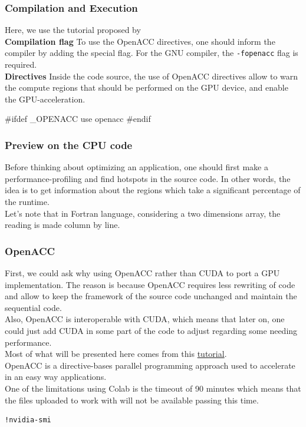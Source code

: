 \documentclass[10pt,a4paper]{article}
\newcommand{\code}[1]{\colorbox{light-gray}{\texttt{#1}}}
\begin{document}
\subsubsection{Compilation and Execution}
Here, we use the tutorial proposed by \href{https://colab.research.google.com/github/ENCCS/OpenACC-CUDA-beginners/blob/colab_gcc/examples/openACC_CUDA_colab.ipynb#scrollTo=6WS9YBwSAsnf}{}\\
\textbf{Compilation flag}
To use the OpenACC directives, one should inform the compiler by adding the special flag. For the GNU compiler, the \code{-fopenacc} flag is required.\\
\textbf{Directives}
Inside the code source, the use of OpenACC directives allow to warn the compute regions that should be performed on the GPU device, and enable the GPU-acceleration.\\
\begin{mylisting}
#ifdef _OPENACC
	use openacc
#endif
\end{mylisting}


\subsubsection{Preview on the CPU code}
Before thinking about optimizing an application, one should first make a performance-profiling and find hotspots in the source code. In other words, the idea is to get information about the regions which take a significant percentage of the runtime.\\ 
Let's note that in Fortran language, considering a two dimensions array, the reading is made column by line. 

\subsubsection{OpenACC}
First, we could ask why using OpenACC rather than CUDA to port a GPU implementation. The reason is because OpenACC requires less rewriting of code and allow to keep the framework of the source code unchanged and maintain the sequential code.\\ 
Also, OpenACC is interoperable with CUDA, which means that later on, one could just add CUDA in some part of the code to adjust regarding some needing performance.\\
Most of what will be presented here comes from this \href{https://colab.research.google.com/github/ENCCS/OpenACC-CUDA-beginners/blob/colab_gcc/examples/openACC_CUDA_colab.ipynb}{tutorial}.\\
OpenACC is a directive-bases parallel programming approach used to accelerate in an easy way applications.\\
One of the limitations using Colab is the timeout of 90 minutes which means that the files uploaded to work with will not be available passing this time.
\begin{lstlisting}
!nvidia-smi
\end{lstlisting}
\end{document}
